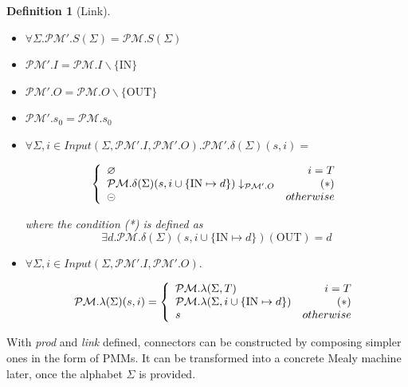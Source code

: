 \documentclass[conference, a4paper]{IEEEtran}
\newtheorem{definition}{Definition}
\newcommand{\rblock}[0]{\circleddash}
\newcommand{\rempty}[0]{\varnothing}
\newcommand{\OUT}[0]{\mbox{OUT}}
\newcommand{\IN}[0]{\mbox{IN}}
\begin{document}
\begin{definition}[Link]
  \begin{itemize}
  	\item[-] $\forall\Sigma. \mathcal{PM}'.S(\Sigma)=\mathcal{PM}.S(\Sigma)$
    \item[-] $\mathcal{PM}'.I=\mathcal{PM}.I\backslash\{\IN\}$
    \item[-] $\mathcal{PM}'.O=\mathcal{PM}.O\backslash\{\OUT\}$
    \item[-] $\mathcal{PM}'.s_0=\mathcal{PM}.s_0$
    \item[-] $\forall\Sigma, i\in
      Input(\Sigma,\mathcal{PM}'.I,\mathcal{PM}'.O).\mathcal{PM}'.\delta(\Sigma)(s,i)=$
      \begin{small}
        \begin{displaymath}
          \left\{
          \begin{array}[h]{lr}
            \rempty & i=T \\
            \mathcal{PM}.\delta(\Sigma)(s,i\cup\{\IN\mapsto d\})\downarrow_{\mathcal{PM}'.O} & (*)\\
            \rblock & otherwise \\
          \end{array}
          \right.
        \end{displaymath}
      \end{small}
      where the condition (*) is defined as
      \[
      \exists d.\mathcal{PM}.\delta(\Sigma)(s,i\cup\{\IN\mapsto d\})(\OUT)=d
      \]
    \item[-] $\forall\Sigma, i\in
      Input(\Sigma,\mathcal{PM}'.I,\mathcal{PM}'.O).$
      \begin{small}
        \begin{displaymath}
          \mathcal{PM}.\lambda(\Sigma)(s,i)=
          \left\{
          \begin{array}[ht]{lr}
            \mathcal{PM}.\lambda(\Sigma,T) & i=T \\
            \mathcal{PM}.\lambda(\Sigma,i\cup\{\IN\mapsto d\}) & (*)\\
            s & otherwise \\
          \end{array}
          \right.
        \end{displaymath}
      \end{small}
  \end{itemize}
\end{definition}

With \emph{prod} and \emph{link} defined, connectors can be constructed by composing simpler ones in
the form of PMMs. It can be transformed into a concrete Mealy machine later, once the alphabet
$\Sigma$ is provided.
\end{document}
